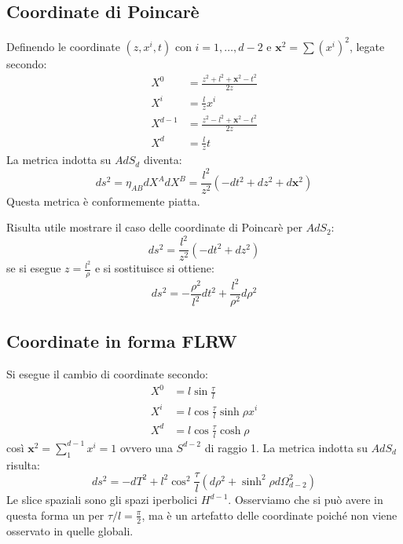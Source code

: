 \subsection{Coordinate di Poincarè}
Definendo le coordinate $(z, x^i,t)$ con $i = 1,\dots, d-2$ e $\bm{x}^2 = \sum (x^i)^2$,  legate secondo:
\begin{align*}
    X^0 &= \frac{z^2 + l^2 + \bm{x}^2 - t^2}{2z} \\
    X^i &= \frac{l}{z}x^i \\
    X^{d-1} &=  \frac{z^2 - l^2 + \bm{x}^2 - t^2}{2z} \\
    X^d &= \frac{l}{z}t
\end{align*}
La metrica indotta su $AdS_d$ diventa:
\begin{equation*}
    ds^2 = \eta_{AB}dX^A dX^B = \frac{l^2}{z^2}(- dt^2 + dz^2 + d\bm{x}^2)
\end{equation*}
Questa metrica è conformemente piatta.

Risulta utile mostrare il caso delle coordinate di Poincarè per $AdS_2$:
\begin{equation*}
    ds^2 = \frac{l^2}{z^2}(-dt^2 + dz^2)
\end{equation*}
se si esegue $z= \frac{l^2}{\rho}$ e si sostituisce si ottiene:
\begin{equation*}
    ds^2 = - \frac{\rho^2}{l^2}dt^2 + \frac{l^2}{\rho^2}d\rho^2
\end{equation*}
\subsection{Coordinate in forma FLRW}
Si esegue il cambio di coordinate secondo:
\begin{align*}
    X^0 &= l\sin\frac{\tau}{l} \\
    X^i &= l\cos\frac{\tau}{l}\sinh\rho x^i \\
    X^d &= l\cos\frac{\tau}{l}\cosh\rho
\end{align*}
così $\bm{x}^2 = \sum_1^{d-1} x^i = 1$ ovvero una $S^{d-2}$ di raggio 1. La metrica indotta su $AdS_d$ risulta:
\begin{equation*}
    ds^2 = - dT^2 + l^2\cos^2\frac{\tau}{l}(d\rho^2 + \sinh^2\rho d\Omega_{d-2}^2)
\end{equation*}
Le slice spaziali sono gli spazi iperbolici $H^{d-1}$. Osserviamo che si può avere in questa forma un  per $\tau/l = \frac{\pi}{2}$, ma è un artefatto delle coordinate poiché non viene osservato in quelle globali.
